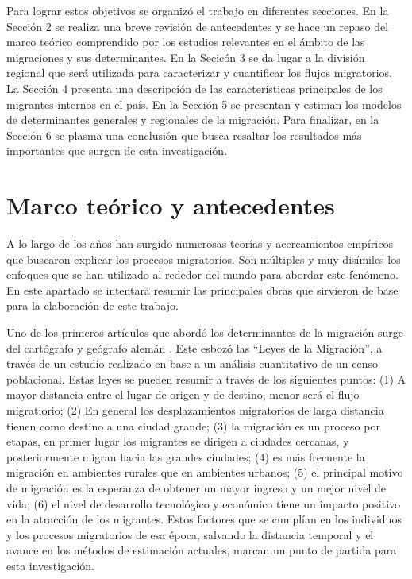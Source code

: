\documentclass[12pt,a4paper]{article}
\begin{document}
Para lograr estos objetivos se organizó el trabajo en diferentes secciones. En la Sección 2 se realiza una breve revisión de antecedentes y se hace un repaso del marco teórico comprendido por los estudios relevantes en el ámbito de las migraciones y sus determinantes. En la Secicón 3 se da lugar a la división regional que será utilizada para caracterizar y cuantificar los flujos migratorios. La Sección 4 presenta  una descripción de las características principales de los migrantes internos en el país. En la Sección 5  se presentan y estiman los modelos de determinantes generales y regionales de la migración. Para finalizar, en la Sección 6 se plasma una conclusión que busca resaltar los resultados más importantes que surgen de esta investigación.

\newpage
\section{Marco teórico y antecedentes}
A lo largo de los años han surgido numerosas teorías y acercamientos empíricos que buscaron explicar los procesos migratorios. Son múltiples y muy disímiles los enfoques que se han utilizado al rededor del mundo para abordar este fenómeno. En este apartado se intentará resumir las principales obras que sirvieron de base para la elaboración de este trabajo.

Uno de los primeros artículos que abordó los determinantes de la migración surge del cartógrafo y geógrafo alemán \textcite{ravenstein_laws_1885}. Este esbozó las ``Leyes de la Migración'', a través de un estudio realizado en base a un análisis cuantitativo de un censo poblacional. Estas leyes se pueden resumir a través de los siguientes puntos: (1) A mayor distancia entre el lugar de origen y de destino, menor será el flujo migratiorio; (2) En general los desplazamientos migratorios de larga distancia tienen como destino a una ciudad grande; (3) la migración es un proceso por etapas, en primer lugar los migrantes se dirigen a ciudades cercanas, y posteriormente migran hacia las grandes ciudades; (4) es más frecuente la migración en ambientes rurales que en ambientes urbanos; (5) el principal motivo de migración es la esperanza de obtener un mayor ingreso y un mejor nivel de vida; (6) el nivel de desarrollo tecnológico y económico tiene un impacto positivo en la atracción de los migrantes. Estos factores que se cumplían en  los individuos y los procesos migratorios de esa época, salvando la distancia temporal y el avance en los métodos de estimación actuales, marcan un punto de partida para esta investigación.
\end{document}
